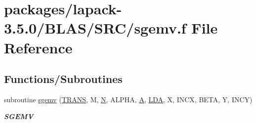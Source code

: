 \hypertarget{lapack-3_85_80_2BLAS_2SRC_2sgemv_8f}{}\section{packages/lapack-\/3.5.0/\+B\+L\+A\+S/\+S\+R\+C/sgemv.f File Reference}
\label{lapack-3_85_80_2BLAS_2SRC_2sgemv_8f}
\subsection*{Functions/\+Subroutines}
\begin{DoxyCompactItemize}
\item 
subroutine \hyperlink{group__single__blas__level2_gafc92361b74c6d41c7e5afa0aa5d13ec9}{sgemv} (\hyperlink{superlu__enum__consts_8h_a0c4e17b2d5cea33f9991ccc6a6678d62a1f61e3015bfe0f0c2c3fda4c5a0cdf58}{T\+R\+A\+N\+S}, M, \hyperlink{polmisc_8c_a0240ac851181b84ac374872dc5434ee4}{N}, A\+L\+P\+H\+A, \hyperlink{classA}{A}, \hyperlink{example__user_8c_ae946da542ce0db94dced19b2ecefd1aa}{L\+D\+A}, X, I\+N\+C\+X, B\+E\+T\+A, Y, I\+N\+C\+Y)
\begin{DoxyCompactList}\small\item\em {\bfseries S\+G\+E\+M\+V} \end{DoxyCompactList}\end{DoxyCompactItemize}
